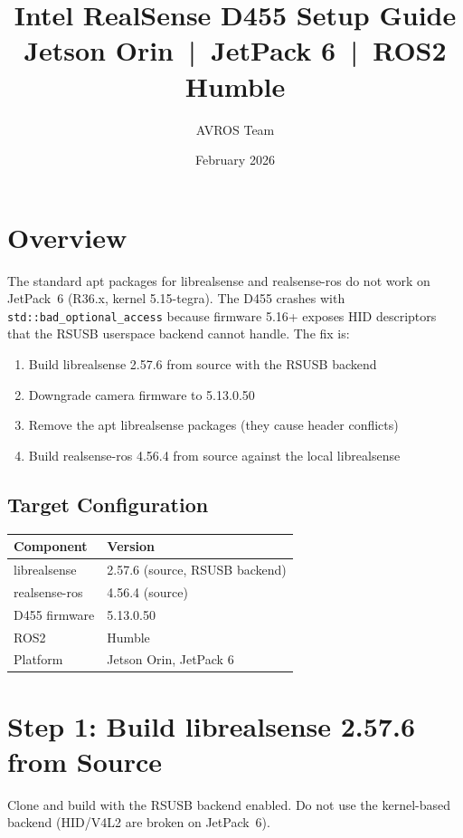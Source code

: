 \documentclass[11pt]{article}
\title{Intel RealSense D455 Setup Guide\\[4pt]
\large Jetson Orin~|~JetPack 6~|~ROS2 Humble}
\author{AVROS Team}
\date{February 2026}
\begin{document}
\maketitle

\section{Overview}

The standard apt packages for librealsense and realsense-ros do not work on JetPack~6 (R36.x, kernel 5.15-tegra). The D455 crashes with \texttt{std::bad\_optional\_access} because firmware 5.16+ exposes HID descriptors that the RSUSB userspace backend cannot handle. The fix is:

\begin{enumerate}
    \item Build librealsense 2.57.6 from source with the RSUSB backend
    \item Downgrade camera firmware to 5.13.0.50
    \item Remove the apt librealsense packages (they cause header conflicts)
    \item Build realsense-ros 4.56.4 from source against the local librealsense
\end{enumerate}

\subsection*{Target Configuration}

\begin{tabular}{@{}ll@{}}
    \toprule
    Component & Version \\
    \midrule
    librealsense & 2.57.6 (source, RSUSB backend) \\
    realsense-ros & 4.56.4 (source) \\
    D455 firmware & 5.13.0.50 \\
    ROS2 & Humble \\
    Platform & Jetson Orin, JetPack 6 \\
    \bottomrule
\end{tabular}

\section{Step 1: Build librealsense 2.57.6 from Source}

Clone and build with the RSUSB backend enabled. Do not use the kernel-based backend (HID/V4L2 are broken on JetPack~6).
\end{document}
